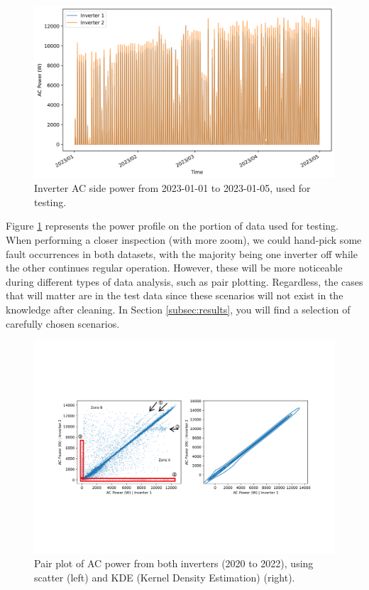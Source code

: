 \begin{figure}[h!]
    \centering
    \includegraphics[width=\textwidth]{figures/chapter5/analysis/01_power_test-1.png}
    \caption{Inverter AC side power from 2023-01-01 to 2023-01-05, used for testing.}
    \label{fig:eda_power_test}
\end{figure}

Figure \ref{fig:eda_power_test} represents the power profile on the portion of data used for testing. When performing a closer inspection (with more zoom), we could hand-pick some fault occurrences in both datasets, with the majority being one inverter off while the other continues regular operation. However, these will be more noticeable during different types of data analysis, such as pair plotting. Regardless, the cases that will matter are in the test data since these scenarios will not exist in the knowledge after cleaning. In Section \ref{subsec:results}, you will find a selection of carefully chosen scenarios.

\begin{figure}[h!]
    \centering
    \includegraphics[width=\textwidth,trim={0 5.5cm 0cm 5.5cm},clip]{figures/chapter5/analysis/02_power_pairplots_kb_annotated-1.png}
    \caption{Pair plot of AC power from both inverters (2020 to 2022), using scatter (left) and KDE (Kernel Density Estimation) (right).}
    \label{fig:eda_power_kb_pair}
\end{figure}

